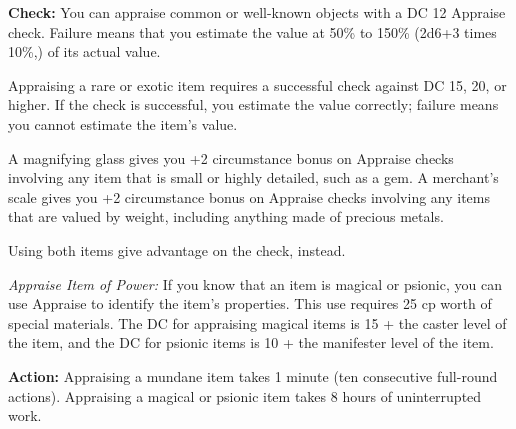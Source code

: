\textbf{Check:} You can appraise common or well-known objects with a DC 12 Appraise check. Failure means that you estimate the value at 50\% to 150\% (2d6+3 times 10\%,) of its actual value.

Appraising a rare or exotic item requires a successful check against DC 15, 20, or higher. If the check is successful, you estimate the value correctly; failure means you cannot estimate the item's value.


A magnifying glass gives you +2 circumstance bonus on Appraise checks involving any item that is small or highly detailed, such as a gem. A merchant's scale gives you +2 circumstance bonus on Appraise checks involving any items that are valued by weight, including anything made of precious metals.

Using both items give advantage on the check, instead.

\textit{Appraise Item of Power:} If you know that an item is magical or psionic, you can use Appraise to identify the item's properties. This use requires 25 cp worth of special materials. The DC for appraising magical items is 15 + the caster level of the item, and the DC for psionic items is 10 + the manifester level of the item.

\textbf{Action:} Appraising a mundane item takes 1 minute (ten consecutive full-round actions). Appraising a magical or psionic item takes 8 hours of uninterrupted work.

